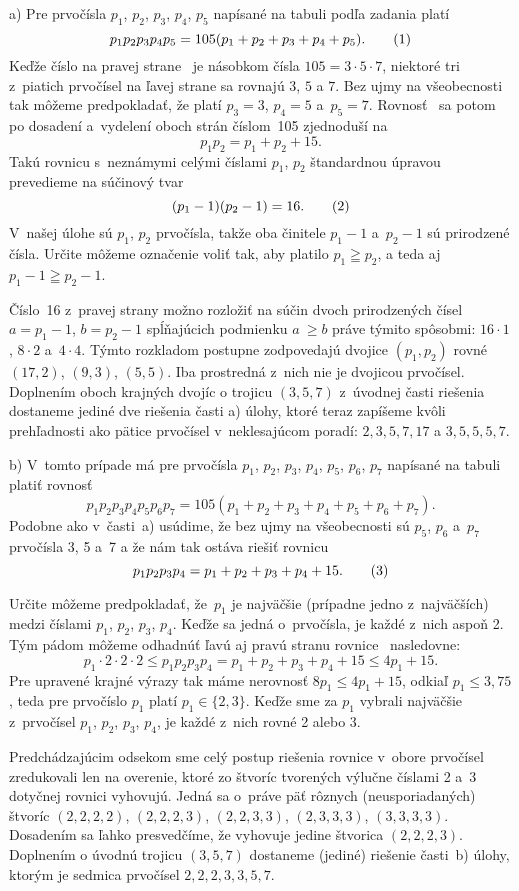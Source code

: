 ﻿{%
a) Pre prvočísla $p_1$, $p_2$, $p_3$, $p_4$, $p_5$
napísané na tabuli podľa zadania platí
$$
p_1p_2p_3p_4p_5=105(p_1+p_2+p_3+p_4+p_5).
\tag1
$$
Keďže číslo na pravej strane~ je násobkom čísla $105=3\cdot5\cdot7$,
niektoré tri z~piatich prvočísel na ľavej strane  sa rovnajú $3$, $5$ a $7$.
Bez ujmy na všeobecnosti tak môžeme predpokladať, že platí
$p_3=3$, $p_4=5$ a~$p_5=7$. Rovnosť~ sa potom po dosadení a~vydelení
oboch strán číslom~105 zjednoduší na
$$
p_1p_2=p_1+p_2+15.
$$
Takú rovnicu s~neznámymi celými číslami $p_1$, $p_2$ štandardnou
úpravou prevedieme na súčinový tvar
$$
(p_1-1)(p_2-1)=16.
\tag2
$$
V~našej úlohe sú $p_1$, $p_2$ prvočísla, takže oba činitele
$p_1-1$ a~$p_2-1$ sú prirodzené čísla. Určite môžeme označenie voliť
tak, aby platilo $p_1\geqq p_2$, a teda aj $p_1-1\geqq p_2-1$.

Číslo~16 z~pravej strany  možno rozložiť na súčin
dvoch prirodzených čísel $a=p_1-1$, $b=p_2-1$ spĺňajúcich podmienku $a~\ge b$
práve týmito spôsobmi: $16 \cdot 1$, $8 \cdot 2$ a~$4 \cdot 4$.
Týmto rozkladom postupne zodpovedajú dvojice $(p_1,p_2)$ rovné
$(17,2)$, $(9,3)$, $(5,5)$. Iba prostredná z~nich nie je
dvojicou prvočísel. Doplnením oboch krajných dvojíc o trojicu
$(3,5,7)$ z~úvodnej časti riešenia dostaneme jediné dve riešenia
časti a) úlohy, ktoré teraz zapíšeme kvôli prehľadnosti
ako pätice prvočísel v~neklesajúcom poradí: $2,3,5,7,17$ a
$3,5,5,5,7$.

\medskip
b) V~tomto prípade má pre prvočísla $p_1$, $p_2$, $p_3$, $p_4$,
$p_5$, $p_6$, $p_7$ napísané na tabuli platiť rovnosť
$$
p_1p_2p_3p_4p_5p_6p_7=105(p_1+p_2+p_3+p_4+p_5+p_6+p_7).
$$
Podobne ako v~časti~a) usúdime, že bez ujmy na všeobecnosti sú
$p_5$, $p_6$ a~$p_7$ prvočísla 3, 5 a~7 a že nám tak ostáva riešiť
rovnicu
$$
p_1p_2p_3p_4 = p_1+p_2+p_3+p_4+15.
\tag3
$$

Určite môžeme predpokladať, že~$p_1$ je najväčšie (prípadne jedno
z~najväčších) medzi číslami $p_1$, $p_2$, $p_3$, $p_4$.
Keďže sa jedná o~prvočísla, je každé z~nich aspoň 2.
Tým pádom môžeme odhadnúť ľavú aj pravú stranu rovnice~ nasledovne:
$$
p_1 \cdot 2 \cdot 2 \cdot 2 \leq
p_1p_2p_3p_4 = p_1+p_2+p_3+p_4+15 \leq 4p_1+15.
$$
Pre upravené krajné výrazy tak máme nerovnosť
$8p_1 \leq 4p_1+15$, odkiaľ $p_1 \leq 3{,}75$,
teda pre prvočíslo $p_1$ platí $p_1\in\{2,3\}$.
Keďže sme za $p_1$ vybrali najväčšie z~prvočísel
$p_1$, $p_2$, $p_3$, $p_4$, je každé z~nich rovné 2 alebo 3.

Predchádzajúcim odsekom sme celý postup riešenia rovnice 
v~obore prvočísel zredukovali len na overenie,
ktoré zo štvoríc tvorených výlučne číslami 2 a~3
dotyčnej rovnici vyhovujú.
Jedná sa o~práve päť rôznych (neusporiadaných) štvoríc
$(2,2,2,2)$, $(2,2,2,3)$, $(2,2,3,3)$, $(2,3,3,3)$, $(3,3,3,3)$.
Dosadením sa ľahko presvedčíme, že vyhovuje jedine štvorica
$(2,2,2,3)$. Doplnením o úvodnú trojicu $(3,5,7)$ dostaneme
(jediné) riešenie časti~b) úlohy, ktorým je sedmica prvočísel
$2,2,2,3,3,5,7$.

}
